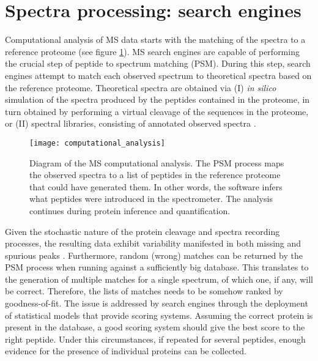 \section{Spectra processing: search engines}
\label{sec:search_engines}

Computational analysis of MS data starts with the matching of the spectra to a reference proteome (see figure \ref{fig:computational_analysis}). \ac{MS} search engines are capable of performing the crucial step of peptide to spectrum matching (PSM). During this step, search engines attempt to match each observed spectrum to theoretical spectra based on the reference proteome. Theoretical spectra are obtained via (I) \textit{in silico} simulation of the spectra produced by the peptides contained in the proteome, in turn obtained by performing a virtual cleavage of the sequences in the proteome, or (II) spectral libraries, consisting of annotated observed spectra \cite{Li2012}.


\begin{figure}[!h]
\texttt{[image: computational\_analysis]}
\caption[Mass spectrometry computational analysis]{Diagram of the MS computational analysis. The PSM process maps the observed spectra to a list of peptides in the reference proteome that could have generated them. In other words, the software infers what peptides were introduced in the spectrometer. The analysis continues during protein inference and quantification.}
\label{fig:computational_analysis}
\end{figure}


Given the stochastic nature of the protein cleavage and spectra recording processes, the resulting data exhibit variability manifested in both missing and spurious peaks \cite{Stein1999}. Furthermore, random (wrong) matches can be returned by the PSM process when running against a sufficiently big database. This translates to the generation of multiple matches for a single spectrum, of which one, if any, will be correct. Therefore, the lists of matches needs to be somehow ranked by goodness-of-fit. The issue is addressed by search engines through the deployment of statistical models that provide scoring systems. Assuming the correct protein is present in the database, a good scoring system should give the best score to the right peptide. Under this circumstances, if repeated for several peptides, enough evidence for the presence of individual proteins can be collected.

